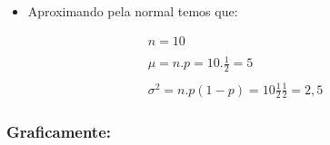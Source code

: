 \documentclass[
  letterpaper,
  DIV=11,
  numbers=noendperiod]{scrartcl}
\providecommand{\tightlist}{%
  \setlength{\itemsep}{0pt}\setlength{\parskip}{0pt}}
\begin{document}
\begin{itemize}
\tightlist
\item
  Aproximando pela normal temos que:
\end{itemize}

\[\begin{array}{ccc}
 n=10
 \\
 \\
 \mu=n.p=10 . \frac{1}{2}=5
 \\
 \\
 \sigma^{2}=n.p (1-p)=10 \frac{1}{2} \frac{1}{2}=2,5
\end{array}\]

\subsubsection{Graficamente:}\label{graficamente-1}
\end{document}
